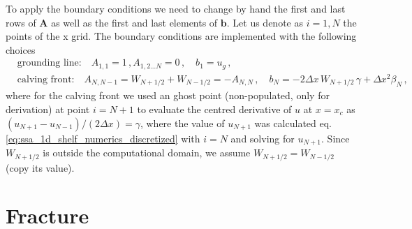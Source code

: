 \documentclass[11pt,a4paper]{article}
\begin{document}
To apply the boundary conditions we need to change by hand the first and last rows of $\mathbf{A}$ as well as the first and last elements of $\mathbf{b}$. Let us denote as $i=1,N$ the points of the x grid. The boundary conditions are implemented with the following choices
\begin{align*}
    &\text{grounding line:} 
    \quad
    A_{1,1}=1 
    \,,
    A_{1,2 \dots N}=0
    \,, \quad
    b_1 = u_g
    \,,
    \\
    &\text{calving front:}
    \quad
    A_{N,N-1} = W_{N+1/2} + W_{N-1/2} = - A_{N,N}
    \,, \quad
    b_N = - 2 \Delta x \, W_{N+1/2} \, \gamma + \Delta x^2 \beta_N
    \,,
\end{align*}
where for the calving front we used an ghost point (non-populated, only for derivation) at point $i=N+1$ to evaluate the centred derivative of $u$ at $x=x_c$ as $(u_{N+1}-u_{N-1})/(2 \Delta x) = \gamma$, where the value of $u_{N+1}$ was calculated eq. \eqref{eq:ssa_1d_shelf_numerics_discretized} with $i=N$ and solving for $u_{N+1}$. Since $W_{N+1/2}$ is outside the computational domain, we assume $W_{N+1/2} = W_{N-1/2}$ (copy its value).

\section{Fracture}
\end{document}
